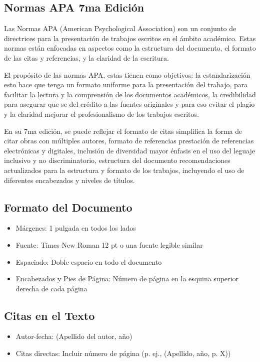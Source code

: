 \documentclass[12pt]{article}
\begin{document}
\subsection*{Normas APA 7ma Edición}
Las Normas APA (American Psychological Association) son un conjunto de directrices para la presentación de trabajos escritos en el ámbito académico. Estas normas están enfocadas en aspectos como la estructura del documento, el formato de las citas y referencias, y la claridad de la escritura.

El propósito de las normas APA, estas tienen como objetivos: la estandarización esto hace que tenga un formato uniforme para la presentación del trabajo, para facilitar la lectura y la comprensión de los documentos académicos, la credibilidad para asegurar que se del crédito a las fuentes originales y para eso evitar el plagio y la claridad mejorar el profesionalismo de los trabajos escritos.

En su 7ma edición, se puede reflejar el formato de citas simplifica la forma de citar obras con múltiples autores, formato de referencias prestación de referencias electrónicas y digitales, inclusión de diversidad mayor énfasis en el uso del leguaje inclusivo y no discriminatorio, estructura del documento recomendaciones actualizados para la estructura y formato de los trabajos, incluyendo el uso de diferentes encabezados y niveles de títulos.

\subsection*{Formato del Documento}
\begin{itemize}
    \item Márgenes: 1 pulgada en todos los lados
    \item Fuente: Times New Roman 12 pt o una fuente legible similar
    \item Espaciado: Doble espacio en todo el documento
    \item Encabezados y Pies de Página: Número de página en la esquina superior derecha de cada página
\end{itemize}

\subsection*{Citas en el Texto}
\begin{itemize}
    \item Autor-fecha: (Apellido del autor, año)
    \item Citas directas: Incluir número de página (p. ej., (Apellido, año, p. X))
\end{itemize}
\end{document}
